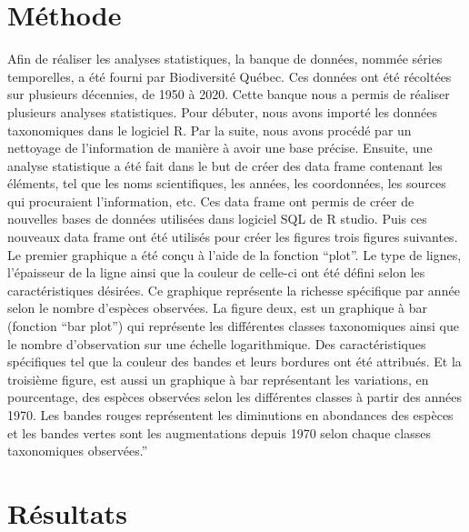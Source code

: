 \documentclass[9pt,twocolumn,twoside,]{pnas-new}
\begin{document}
\section{Méthode}\label{muxe9thode}

Afin de réaliser les analyses statistiques, la banque de données, nommée
séries temporelles, a été fourni par Biodiversité Québec. Ces données
ont été récoltées sur plusieurs décennies, de 1950 à 2020. Cette banque
nous a permis de réaliser plusieurs analyses statistiques. Pour débuter,
nous avons importé les données taxonomiques dans le logiciel R. Par la
suite, nous avons procédé par un nettoyage de l'information de manière à
avoir une base précise. Ensuite, une analyse statistique a été fait dans
le but de créer des data frame contenant les éléments, tel que les noms
scientifiques, les années, les coordonnées, les sources qui procuraient
l'information, etc. Ces data frame ont permis de créer de nouvelles
bases de données utilisées dans logiciel SQL de R studio. Puis ces
nouveaux data frame ont été utilisés pour créer les figures trois
figures suivantes. Le premier graphique a été conçu à l'aide de la
fonction ``plot''. Le type de lignes, l'épaisseur de la ligne ainsi que
la couleur de celle-ci ont été défini selon les caractéristiques
désirées. Ce graphique représente la richesse spécifique par année selon
le nombre d'espèces observées. La figure deux, est un graphique à bar
(fonction ``bar plot'') qui représente les différentes classes
taxonomiques ainsi que le nombre d'observation sur une échelle
logarithmique. Des caractéristiques spécifiques tel que la couleur des
bandes et leurs bordures ont été attribués. Et la troisième figure, est
aussi un graphique à bar représentant les variations, en pourcentage,
des espèces observées selon les différentes classes à partir des années
1970. Les bandes rouges représentent les diminutions en abondances des
espèces et les bandes vertes sont les augmentations depuis 1970 selon
chaque classes taxonomiques observées.''

\section{Résultats}\label{ruxe9sultats}
\end{document}

